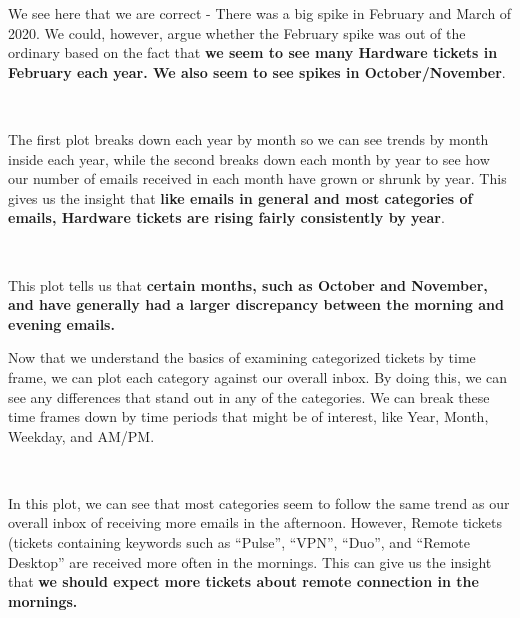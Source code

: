 \documentclass[11pt]{article}
\begin{document}
    We see here that we are correct - There was a big spike in February and
March of 2020. We could, however, argue whether the February spike was
out of the ordinary based on the fact that \textbf{we seem to see many
Hardware tickets in February each year. We also seem to see spikes in
October/November}.

    \begin{center}
    \end{center}
    { \hspace*{\fill} \\}
    
    The first plot breaks down each year by month so we can see trends by
month inside each year, while the second breaks down each month by year
to see how our number of emails received in each month have grown or
shrunk by year. This gives us the insight that \textbf{like emails in
general and most categories of emails, Hardware tickets are rising fairly
consistently by year}.

    \begin{center}
    \end{center}
    { \hspace*{\fill} \\}
    
    This plot tells us that \textbf{certain months, such as October and
November, and have generally had a larger discrepancy between the
morning and evening emails.}

    Now that we understand the basics of examining categorized tickets by
time frame, we can plot each category against our overall inbox. By
doing this, we can see any differences that stand out in any of the
categories. We can break these time frames down by time periods that
might be of interest, like Year, Month, Weekday, and AM/PM.

    \begin{center}

    \end{center}
    { \hspace*{\fill} \\}
    
    In this plot, we can see that most categories seem to follow the same
trend as our overall inbox of receiving more emails in the afternoon.
However, Remote tickets (tickets containing keywords such as ``Pulse'',
``VPN'', ``Duo'', and ``Remote Desktop'' are received more often in the
mornings. This can give us the insight that \textbf{we should expect
more tickets about remote connection in the mornings.}
\end{document}
